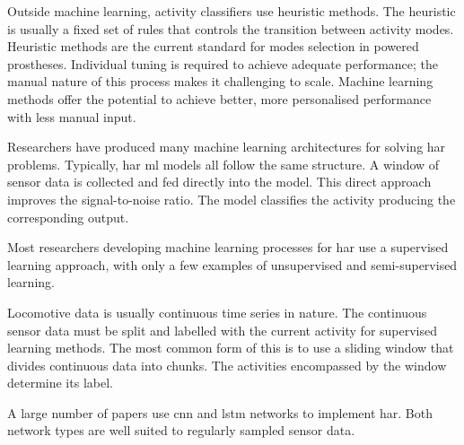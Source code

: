 Outside machine learning, activity classifiers use heuristic methods. The heuristic is usually a fixed set of rules that controls the transition between activity modes. Heuristic methods are the current standard for modes selection in powered prostheses\cite{Varol2008, Lawson2014, Gorsic2014, Young2014a}. Individual tuning is required to achieve adequate performance; the manual nature of this process makes it challenging to scale\cite{Tucker2015}. Machine learning methods offer the potential to achieve better, more personalised performance with less manual input\cite{Hernandez2021, Zhu2019, Rai2019a}.

Researchers have produced many machine learning architectures for solving \acrshort{har} problems. Typically, \acrshort{har} \acrshort{ml} models all follow the same structure. A window of sensor data is collected and fed directly into the model. This direct approach improves the signal-to-noise ratio\cite{Hernandez2021}. The model classifies the activity producing the corresponding output.%


Most researchers developing machine learning processes for \acrshort{har} use a supervised learning approach\cite{Saini2020, Straczkiewicz2021}, with only a few examples of unsupervised and semi-supervised learning\cite{Bota2019}.

Locomotive data is usually continuous time series in nature. The continuous sensor data must be split and labelled with the current activity for supervised learning methods. The most common form of this is to use a sliding window that divides continuous data into chunks. The activities encompassed by the window determine its label.

A large number of papers use \acrfull{cnn} and \acrfull{lstm} networks to implement \acrshort{har}. Both network types are well suited to regularly sampled sensor data. 

